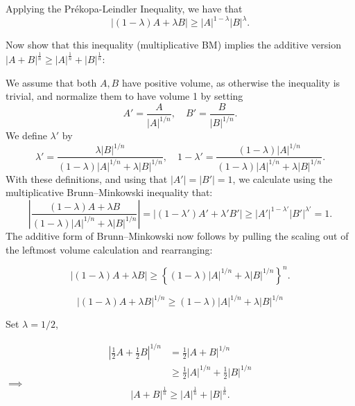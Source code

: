 \documentclass[UTF8,a4paper,10pt]{article}
\begin{document}
Applying the Prékopa-Leindler Inequality, we have that 
\begin{equation*}
  |(1-\lambda)A+\lambda B| \geq {|A|}^{1-\lambda} |B|^{\lambda}.
\end{equation*}

Now show that this inequality (multiplicative BM) implies the additive version\(|A + B|^\frac{1}{n} \geq |A|^\frac{1}{n} + |B|^\frac{1}{n}\):

We assume that both \(A, B\) have positive volume, as otherwise the inequality is trivial, and normalize them to have volume 1 by setting
\[
A' = \frac{A}{|A|^{1/n}}, \quad B' = \frac{B}{|B|^{1/n}}.
\]
We define \(\lambda'\) by
\[
\lambda'  = \frac{\lambda |B|^{1/n}}{(1-\lambda)|A|^{1/n} + \lambda |B|^{1/n}}, \quad 1 - \lambda' = \frac{(1-\lambda)|A|^{1/n}}{(1-\lambda)|A|^{1/n} + \lambda |B|^{1/n}}.
\]
With these definitions, and using that \(|A'| = |B'| = 1\), we calculate using the multiplicative Brunn--Minkowski inequality that:
\[
\left| \frac{(1 - \lambda) A + \lambda B}{(1 - \lambda)|A|^{1/n} + \lambda |B|^{1/n}} \right| = \left| (1 - \lambda') A' + \lambda' B' \right| \geq |A'|^{1-\lambda'} |B'|^{\lambda'} = 1.
\]
The additive form of Brunn--Minkowski now follows by pulling the scaling out of the leftmost volume calculation and rearranging:

\[
\left| (1 - \lambda) A + \lambda B\right| \geq  \left\{(1 - \lambda)|A|^{1/n} + \lambda |B|^{1/n}\right\}^n.
\]

\[
{\left| (1 - \lambda) A + \lambda B \right|}^{1/n} \geq (1 - \lambda)|A|^{1/n} + \lambda |B|^{1/n}
\]

Set \(\lambda = 1/2\), 

\begin{equation*}
  \begin{aligned}
    {\left| \frac{1}{2} A +  \frac{1}{2} B \right|}^{1/n}  
    &= \frac{1}{2} {\left|  A + B \right|}^{1/n} 
    \\
    &\geq \frac{1}{2}|A|^{1/n} + \frac{1}{2} |B|^{1/n}
  \end{aligned}
\end{equation*}
\(\implies\)
$$
|A + B|^\frac{1}{n} \geq |A|^\frac{1}{n} + |B|^\frac{1}{n}.
$$
\end{document}
